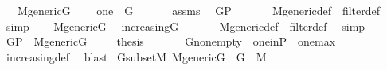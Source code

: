 \begin{isabellebody}
\ \ \ {\isachardoublequoteopen}M{\isacharunderscore}{\kern0pt}generic{\isacharparenleft}{\kern0pt}G{\isacharparenright}{\kern0pt}{\isachardoublequoteclose}\isanewline
\ \ \ \ {\isachardoublequoteopen}one\ {\isasymin}\ G{\isachardoublequoteclose}\ \isanewline
%
\isadelimproof
%
\endisadelimproof
%
\isatagproof
{}\isamarkupfalse%
\ {\isacharminus}{\kern0pt}\isanewline
\ \ \isamarkupfalse%
\ assms\ \isamarkupfalse%
\ {\isachardoublequoteopen}G{\isasymsubseteq}P{\isachardoublequoteclose}\ \isanewline
\ \ \ \ \isamarkupfalse%
\ M{\isacharunderscore}{\kern0pt}generic{\isacharunderscore}{\kern0pt}def\ \ filter{\isacharunderscore}{\kern0pt}def\ \isamarkupfalse%
\ simp\isanewline
\ \ \isamarkupfalse%
\ {\isacartoucheopen}M{\isacharunderscore}{\kern0pt}generic{\isacharparenleft}{\kern0pt}G{\isacharparenright}{\kern0pt}{\isacartoucheclose}\ \isamarkupfalse%
\ {\isachardoublequoteopen}increasing{\isacharparenleft}{\kern0pt}G{\isacharparenright}{\kern0pt}{\isachardoublequoteclose}\ \isanewline
\ \ \ \ \isamarkupfalse%
\ M{\isacharunderscore}{\kern0pt}generic{\isacharunderscore}{\kern0pt}def\ \ filter{\isacharunderscore}{\kern0pt}def\ \isamarkupfalse%
\ simp\isanewline
\ \ \isamarkupfalse%
\ {\isacartoucheopen}G{\isasymsubseteq}P{\isacartoucheclose}\ \ {\isacartoucheopen}M{\isacharunderscore}{\kern0pt}generic{\isacharparenleft}{\kern0pt}G{\isacharparenright}{\kern0pt}{\isacartoucheclose}\ \isanewline
\ \ \isamarkupfalse%
\ {\isacharquery}{\kern0pt}thesis\ \isanewline
\ \ \ \ \isamarkupfalse%
\ G{\isacharunderscore}{\kern0pt}nonempty\ \ one{\isacharunderscore}{\kern0pt}in{\isacharunderscore}{\kern0pt}P\ \ one{\isacharunderscore}{\kern0pt}max\ \isanewline
\ \ \ \ \isamarkupfalse%
\ increasing{\isacharunderscore}{\kern0pt}def\ \isamarkupfalse%
\ blast\isanewline
{}\isamarkupfalse%
%
\endisatagproof
{\isafoldproof}%
%
\isadelimproof
\isanewline
%
\endisadelimproof
\isanewline
{}\isamarkupfalse%
\ G{\isacharunderscore}{\kern0pt}subset{\isacharunderscore}{\kern0pt}M{\isacharcolon}{\kern0pt}\ {\isachardoublequoteopen}M{\isacharunderscore}{\kern0pt}generic{\isacharparenleft}{\kern0pt}G{\isacharparenright}{\kern0pt}\ {\isasymLongrightarrow}\ G\ {\isasymsubseteq}\ M{\isachardoublequoteclose}\isanewline

\end{isabellebody}
